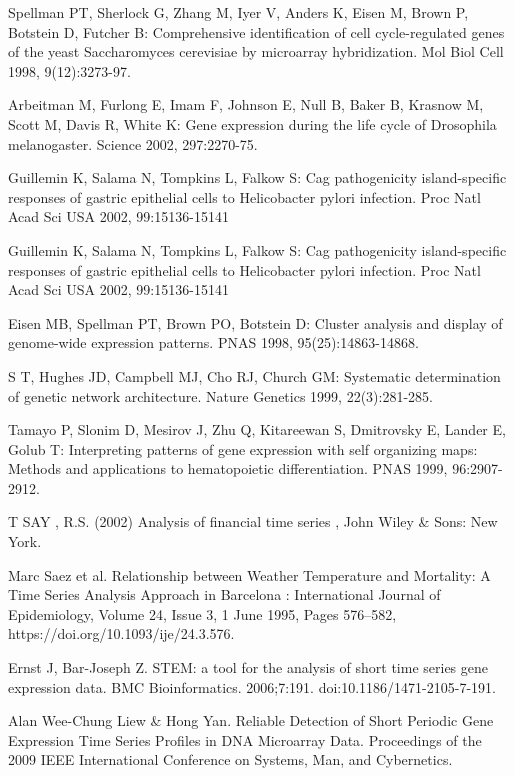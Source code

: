 \begin{thebibliography}{19}

 Spellman PT, Sherlock G, Zhang M, Iyer V, Anders K, Eisen M, Brown
P, Botstein D, Futcher B: Comprehensive identification of cell
cycle-regulated genes of the yeast Saccharomyces cerevisiae
by microarray hybridization. Mol Biol Cell 1998, 9(12):3273-97.

 Arbeitman M, Furlong E, Imam F, Johnson E, Null B, Baker B, Krasnow
M, Scott M, Davis R, White K: Gene expression during the life
cycle of Drosophila melanogaster. Science 2002, 297:2270-75.

 Guillemin K, Salama N, Tompkins L, Falkow S: Cag pathogenicity
island-specific responses of gastric epithelial cells to Helicobacter pylori infection. Proc Natl Acad Sci USA 2002,
99:15136-15141

 Guillemin K, Salama N, Tompkins L, Falkow S: Cag pathogenicity
island-specific responses of gastric epithelial cells to Helicobacter pylori infection. Proc Natl Acad Sci USA 2002,
99:15136-15141

 Eisen MB, Spellman PT, Brown PO, Botstein D: Cluster analysis
and display of genome-wide expression patterns. PNAS 1998,
95(25):14863-14868.

 S T, Hughes JD, Campbell MJ, Cho RJ, Church GM: Systematic
determination of genetic network architecture. Nature Genetics 1999, 22(3):281-285.

 Tamayo P, Slonim D, Mesirov J, Zhu Q, Kitareewan S, Dmitrovsky E,
Lander E, Golub T: Interpreting patterns of gene expression
with self organizing maps: Methods and applications to
hematopoietic differentiation. PNAS 1999, 96:2907-2912.

 T
SAY
, R.S.
(2002)
Analysis of financial time series
, John Wiley \& Sons: New York. 

 Marc Saez et al. Relationship between Weather Temperature and Mortality: A Time Series Analysis Approach in Barcelona :  International Journal of Epidemiology, Volume 24, Issue 3, 1 June 1995, Pages 576–582, https://doi.org/10.1093/ije/24.3.576. 


 Ernst J, Bar-Joseph Z. STEM: a tool for the analysis of short time series gene expression data. BMC Bioinformatics. 2006;7:191. doi:10.1186/1471-2105-7-191.

 Alan Wee-Chung Liew \& Hong Yan. Reliable Detection of Short Periodic Gene Expression
Time Series Profiles in DNA Microarray Data. Proceedings of the 2009 IEEE International Conference on Systems, Man, and Cybernetics.


\end{thebibliography}
